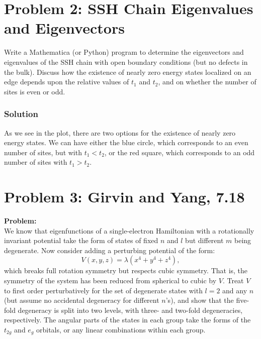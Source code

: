 \documentclass{article}
\begin{document}
\section{Problem 2: SSH Chain Eigenvalues and Eigenvectors}

Write a Mathematica (or Python) program to determine the eigenvectors and eigenvalues of the SSH chain with open boundary conditions (but no defects in the bulk). Discuss how the existence of nearly zero energy states localized on an edge depends upon the relative values of \(t_1\) and \(t_2\), and on whether the number of sites is even or odd.\\
\subsubsection{Solution}
As we see in the plot, there are two options for the existence of nearly zero energy states. We can have either the blue circle, which corresponds to an even number of sites, but with \(t_1 < t_2\), or the red square, which corresponds to an odd number of sites with \(t_1 > t_2\). 

\section{Problem 3: Girvin and Yang, 7.18}

\textbf{Problem:} \\
We know that eigenfunctions of a single-electron Hamiltonian with a rotationally invariant potential take the form of states of fixed $n$ and $l$ but different $m$ being degenerate. Now consider adding a perturbing potential of the form:
\[
V(x, y, z) = \lambda(x^4 + y^4 + z^4),
\]
which breaks full rotation symmetry but respects cubic symmetry. That is, the symmetry of the system has been reduced from spherical to cubic by $V$. Treat $V$ to first order perturbatively for the set of degenerate states with $l=2$ and any $n$ (but assume no accidental degeneracy for different $n$'s), and show that the five-fold degeneracy is split into two levels, with three- and two-fold degeneracies, respectively. The angular parts of the states in each group take the forms of the $t_{2g}$ and $e_g$ orbitals, or any linear combinations within each group.
\end{document}
